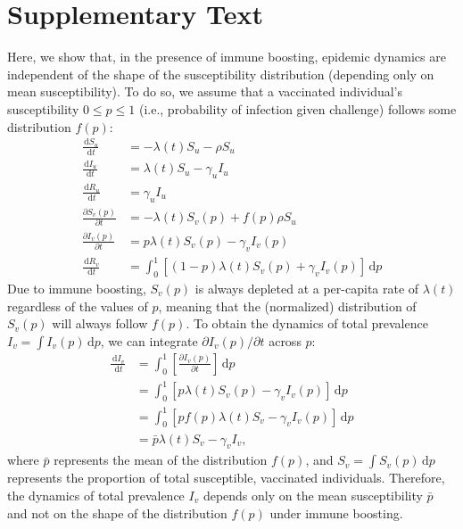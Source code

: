 \documentclass[12pt]{article}
\newcommand{\dd}[1]{\ensuremath{\, \mathrm{d}#1}}
\begin{document}
\pagebreak

\section*{Supplementary Text}

Here, we show that, in the presence of immune boosting, epidemic dynamics are independent of the shape of the susceptibility distribution (depending only on mean susceptibility).
To do so, we assume that a vaccinated individual's susceptibility $0 \leq p \leq 1$ (i.e., probability of infection given challenge) follows some distribution $f(p)$:
\begin{align}
\frac{\dd S_u}{\dd t} &= - \lambda(t) S_u - \rho S_u \\
\frac{\dd I_u}{\dd t} &= \lambda(t) S_u - \gamma_u I_u \\
\frac{\dd R_u}{\dd t} &= \gamma_u I_u \\
\frac{\partial S_v(p)}{\partial t} &= - \lambda(t) S_v(p) + f(p) \rho S_u  \\
\frac{\partial I_v(p)}{\partial t} &= p \lambda(t) S_v(p) - \gamma_v I_v(p) \\
\frac{\dd R_v}{\dd t} &= \int_0^1 \left[ (1-p) \lambda(t) S_v(p) + \gamma_v I_v(p) \right]\dd p
\end{align}
Due to immune boosting, $S_v(p)$ is always depleted at a per-capita rate of $\lambda(t)$ regardless of the values of $p$, meaning that the (normalized) distribution of $S_v(p)$ will always follow $f(p)$.
To obtain the dynamics of total prevalence $I_v = \int I_v(p) \dd p$, we can integrate $\partial I_v(p)/\partial t$ across $p$:
\begin{align}
\frac{\dd I_v}{\dd t} &=  \int_0^1\left[\frac{\partial I_v(p)}{\partial t}\right]\dd p\\
&= \int_0^1\left[p \lambda(t) S_v(p) - \gamma_v I_v(p)\right]\dd p\\
&= \int_0^1\left[p f(p) \lambda(t) S_v - \gamma_v I_v(p)\right]\dd p\\
&= \bar{p} \lambda(t) S_v - \gamma_v I_v,
\end{align}
where $\bar{p}$ represents the mean of the distribution $f(p)$, and $S_v = \int S_v(p) \dd p$ represents the proportion of total susceptible, vaccinated individuals.
Therefore, the dynamics of total prevalence $I_v$ depends only on the mean susceptibility $\bar{p}$ and not on the shape of the distribution $f(p)$ under immune boosting.

\pagebreak


\end{document}
